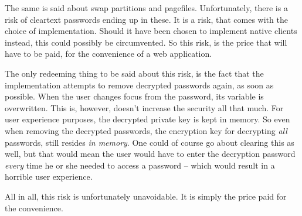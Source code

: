 		The same is said about swap partitions and pagefiles. Unfortunately, there is a risk of cleartext passwords ending up in these. It is a risk, that comes with the choice of implementation. Should it have been chosen to implement native clients instead, this could possibly be circumvented. So this risk, is the price that will have to be paid, for the convenience of a web application.

		The only redeeming thing to be said about this risk, is the fact that the implementation attempts to remove decrypted passwords again, as soon as possible. When the user changes focus from the password, its variable is overwritten. This is, however, doesn't increase the security all that much. For user experience purposes, the decrypted private key is kept in memory. So even when removing the decrypted passwords, the encryption key for decrypting \emph{all} passwords, still resides \emph{in memory}. One could of course go about clearing this as well, but that would mean the user would have to enter the decryption password \emph{every} time he or she needed to access a password -- which would result in a horrible user experience.

		All in all, this risk is unfortunately unavoidable. It is simply the price paid for the convenience.





	